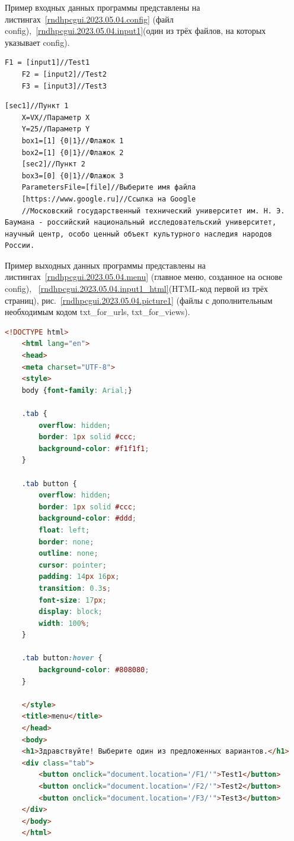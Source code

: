 Пример входных данных программы представлены на листингах~\ref{rndhpcgui.2023.05.04.config} (файл \textsf{config}),~\ref{rndhpcgui.2023.05.04.input1}(один из трёх файлов, на которых указывает \textsf{config}). 

\begin{lstlisting}[frame=single, label={rndhpcgui.2023.05.04.config}, caption={config}, language={aINIExample}] 
    F1 = [input1]//Test1
    F2 = [input2]//Test2
    F3 = [input3]//Test3
\end{lstlisting}

\begin{lstlisting}[frame=single, label={rndhpcgui.2023.05.04.input1}, caption={input1}, language={aINIExample}] 
    [sec1]//Пункт 1
    X=VX//Параметр X
    Y=25//Параметр Y
    box1=[1] {0|1}//Флажок 1
    box2=[1] {0|1}//Флажок 2
    [sec2]//Пункт 2
    box3=[0] {0|1}//Флажок 3
    ParametersFile=[file]//Выберите имя файла
    [https://www.google.ru]//Ссылка на Google
    //Московский государственный технический университет им. Н. Э. Баумана - российский национальный исследовательский университет, научный центр, особо ценный объект культурного наследия народов России.
\end{lstlisting}


Пример выходных данных программы представлены на листингах~\ref{rndhpcgui.2023.05.04.menu} (главное меню, созданное на основе \textsf{config}), ~\ref{rndhpcgui.2023.05.04.input1_html}({HTML}-код первой из трёх страниц), рис.~\ref{rndhpcgui.2023.05.04.picture1} (файлы с дополнительным необходимым кодом txt_for_urls, txt_for_views).
\begin{lstlisting}[frame=single, label={rndhpcgui.2023.05.04.menu}, caption={Главное меню}, language={HTML}] 
    <!DOCTYPE html>
    <html lang="en">
    <head>
    <meta charset="UTF-8">
    <style>
    body {font-family: Arial;}
    
    .tab {
        overflow: hidden;
        border: 1px solid #ccc;
        background-color: #f1f1f1;
    }
    
    .tab button {
        overflow: hidden;
        border: 1px solid #ccc;
        background-color: #ddd;
        float: left;
        border: none;
        outline: none;
        cursor: pointer;
        padding: 14px 16px;
        transition: 0.3s;
        font-size: 17px;
        display: block;
        width: 100%;
    }
    
    .tab button:hover {
        background-color: #808080;
    }
    
    </style>
    <title>menu</title>
    </head>
    <body>
    <h1>Здравствуйте! Выберите один из предложенных вариантов.</h1>
    <div class="tab">
        <button onclick="document.location='/F1/'">Test1</button>
        <button onclick="document.location='/F2/'">Test2</button>
        <button onclick="document.location='/F3/'">Test3</button>
    </div>
    </body>
    </html>
    
\end{lstlisting}

